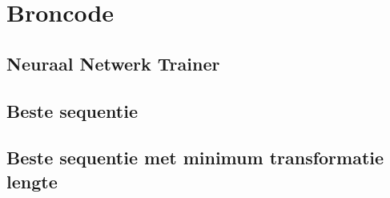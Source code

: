 \chapter{Broncode}
\label{app:broncode}

\section{Neuraal Netwerk Trainer}
\label{Broncode:ANN}


\section{Beste sequentie}
\label{Broncode:algo1}


\section{Beste sequentie met minimum transformatie lengte}
\label{Broncode:algo2}


